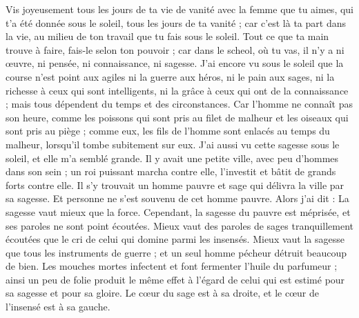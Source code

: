 \begin{multicols}{2}
Vis joyeusement tous les jours de ta vie de vanité avec la femme que tu aimes, qui t'a été donnée sous le soleil, tous les jours de ta vanité ; car c'est là ta part dans la vie, au milieu de ton travail que tu fais sous le soleil.
Tout ce que ta main trouve à faire, fais-le selon ton pouvoir ; car dans le scheol, où tu vas, il n'y a ni œuvre, ni pensée, ni connaissance, ni sagesse.
J'ai encore vu sous le soleil que la course n'est point aux agiles ni la guerre aux héros, ni le pain aux sages, ni la richesse à ceux qui sont intelligents, ni la grâce à ceux qui ont de la connaissance ; mais tous dépendent du temps et des circonstances.
Car l'homme ne connaît pas son heure, comme les poissons qui sont pris au filet de malheur et les oiseaux qui sont pris au piège ; comme eux, les fils de l'homme sont enlacés au temps du malheur, lorsqu'il tombe subitement sur eux.
J'ai aussi vu cette sagesse sous le soleil, et elle m'a semblé grande.
Il y avait une petite ville, avec peu d'hommes dans son sein ; un roi puissant marcha contre elle, l'investit et bâtit de grands forts contre elle.
Il s'y trouvait un homme pauvre et sage qui délivra la ville par sa sagesse. Et personne ne s'est souvenu de cet homme pauvre.
Alors j'ai dit : La sagesse vaut mieux que la force. Cependant, la sagesse du pauvre est méprisée, et ses paroles ne sont point écoutées.
Mieux vaut des paroles de sages tranquillement écoutées que le cri de celui qui domine parmi les insensés.
Mieux vaut la sagesse que tous les instruments de guerre ; et un seul homme pécheur détruit beaucoup de bien.
\VerseOne{}Les mouches mortes infectent et font fermenter l'huile du parfumeur ; ainsi un peu de folie produit le même effet à l'égard de celui qui est estimé pour sa sagesse et pour sa gloire.
Le cœur du sage est à sa droite, et le cœur de l'insensé est à sa gauche.

\end{multicols}
